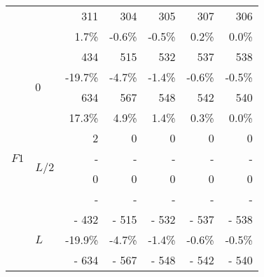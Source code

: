 {{{\begin{tabularx}{0.6\textwidth}{@{} XX rrrrr@{}}
					&&{\color{black}\normalsize 311}&{\color{black}\normalsize 304}&{\color{black}\normalsize 305}&{\color{black}\normalsize 307}&{\color{black}\normalsize 306}\\
					&&{\color{black}\scriptsize1.7\%}&{\color{black}\scriptsize-0.6\%}&{\color{black}\scriptsize-0.5\%}&{\color{black}\scriptsize0.2\%}&{\color{black}\scriptsize0.0\%}\\\midrule
					\multirow{12}{*}{$F1$}&\multirow{4}{*}{$0$}&{\color{Tblue}\normalsize 434}&{\color{Tblue}\normalsize 515}&{\color{Tblue}\normalsize 532}&{\color{Tblue}\normalsize 537}&{\color{Tblue}\normalsize 538}\\
					&&{\color{Tblue}\scriptsize-19.7\%}&{\color{Tblue}\scriptsize-4.7\%}&{\color{Tblue}\scriptsize-1.4\%}&{\color{Tblue}\scriptsize-0.6\%}&{\color{Tblue}\scriptsize-0.5\%}\\
					&&{\color{black}\normalsize 634}&{\color{black}\normalsize 567}&{\color{black}\normalsize 548}&{\color{black}\normalsize 542}&{\color{black}\normalsize 540}\\
					&&{\color{black}\scriptsize17.3\%}&{\color{black}\scriptsize4.9\%}&{\color{black}\scriptsize1.4\%}&{\color{black}\scriptsize0.3\%}&{\color{black}\scriptsize0.0\%}\\\cmidrule[0.5\cmidrulewidth]{2-7}
					&\multirow{4}{*}{$L/2$}&{\color{Tblue}\normalsize 2}&{\color{Tblue}\normalsize 0}&{\color{Tblue}\normalsize 0}&{\color{Tblue}\normalsize 0}&{\color{Tblue}\normalsize 0}\\
					&&{\color{Tblue}\scriptsize-}&{\color{Tblue}\scriptsize-}&{\color{Tblue}\scriptsize-}&{\color{Tblue}\scriptsize-}&{\color{Tblue}\scriptsize-}\\
					&&{\color{black}\normalsize 0}&{\color{black}\normalsize 0}&{\color{black}\normalsize 0}&{\color{black}\normalsize 0}&{\color{black}\normalsize 0}\\
					&&{\color{black}\scriptsize-}&{\color{black}\scriptsize-}&{\color{black}\scriptsize-}&{\color{black}\scriptsize-}&{\color{black}\scriptsize-}\\\cmidrule[0.5\cmidrulewidth]{2-7}
					&\multirow{4}{*}{$L$}&{\color{Tblue}\normalsize- 432}&{\color{Tblue}\normalsize- 515}&{\color{Tblue}\normalsize- 532}&{\color{Tblue}\normalsize- 537}&{\color{Tblue}\normalsize- 538}\\
					&&{\color{Tblue}\scriptsize-19.9\%}&{\color{Tblue}\scriptsize-4.7\%}&{\color{Tblue}\scriptsize-1.4\%}&{\color{Tblue}\scriptsize-0.6\%}&{\color{Tblue}\scriptsize-0.5\%}\\
					&&{\color{black}\normalsize- 634}&{\color{black}\normalsize- 567}&{\color{black}\normalsize- 548}&{\color{black}\normalsize- 542}&{\color{black}\normalsize- 540}\\

\end{tabularx}}}}
